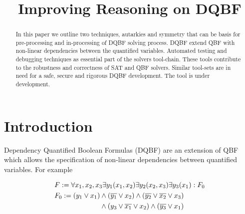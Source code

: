 \documentclass[conference]{IEEEtran}
\begin{document}
\title{Improving Reasoning on DQBF}


\author{
}

\maketitle

\begin{abstract}
In this paper we outline two techniques, autarkies and symmetry that
%
can be basis for pre-processing and in-processing of DQBF solving process.
%
DQBF extend QBF with non-linear dependencies between the quantified variables.
%
Automated testing and debugging techniques as essential part of the solvers tool-chain.
%
These tools contribute to the robustness and correctness of SAT and QBF solvers.
%
Similar tool-sets are in need for a safe, secure and rigorous DQBF development.
%
The tool is under development. 
%    
\end{abstract}



\section{Introduction}
\label{sec:Intro}
Dependency Quantified Boolean Formulas (DQBF) are an extension of QBF
which allows the specification of non-linear dependencies between quantified variables. 
%
%
For example \par\noindent
%
\begin{equation}
\begin{split}
&F := \forall x_1,x_2,x_3 \exists y_1(x_1,x_2) \exists y_2(x_2,x_3) \exists y_3(x_1): F_0 \\
&F_0 := (y_1 \vee x_1) \wedge (\overline{y_1} \vee x_2) \wedge (\overline{y_2} \vee \overline{x_2} \vee x_3) \\
&\hspace{2.3cm}\wedge (y_3 \vee \overline{x_1} \vee x_2) \wedge (\overline{y_3} \vee x_1)
\end{split}
\label{eqn:ex}
\end{equation}
\end{document}
